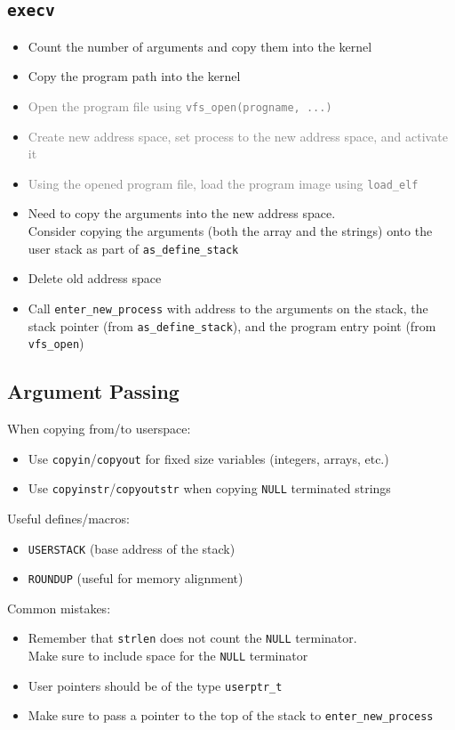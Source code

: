 \documentclass[12pt]{article}
\theoremstyle{plain}
\theoremstyle{definition}
\begin{document}
\subsection{\texttt{execv}}
\begin{itemize}
  \item Count the number of arguments and copy them into the kernel
  \item Copy the program path into the kernel
  \item \textcolor{gray}{Open the program file using \texttt{vfs\_open(progname, ...)}}
  \item \textcolor{gray}{Create new address space, set process to the new address space, and activate it}
  \item \textcolor{gray}{Using the opened program file, load the program image using \texttt{load\_elf}}
  \item Need to copy the arguments into the new address space. \\
  Consider copying the arguments (both the array and the strings) onto the user stack as part of \texttt{as\_define\_stack}
  \item Delete old address space
  \item Call \texttt{enter\_new\_process} with address to the arguments on the stack, the stack pointer (from \texttt{as\_define\_stack}), and the program entry point (from \texttt{vfs\_open})
\end{itemize}

\subsection{Argument Passing}
When copying from/to userspace:
\begin{itemize}
  \item Use \texttt{copyin}/\texttt{copyout} for fixed size variables (integers, arrays, etc.)
  \item Use \texttt{copyinstr}/\texttt{copyoutstr} when copying \texttt{NULL} terminated strings
\end{itemize}

Useful defines/macros:
\begin{itemize}
  \item \texttt{USERSTACK} (base address of the stack)
  \item \texttt{ROUNDUP} (useful for memory alignment)
\end{itemize}

Common mistakes:
\begin{itemize}
  \item Remember that \texttt{strlen} does not count the \texttt{NULL} terminator. \\
  Make sure to include space for the \texttt{NULL} terminator
  \item User pointers should be of the type \texttt{userptr\_t}
  \item Make sure to pass a pointer to the top of the stack to \texttt{enter\_new\_process}
\end{itemize}
\end{document}
